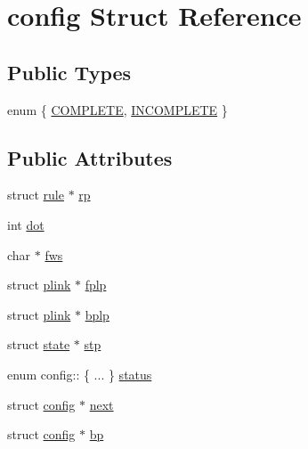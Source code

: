 \hypertarget{structconfig}{\section{config Struct Reference}
\label{structconfig}
}
\subsection*{Public Types}
\begin{DoxyCompactItemize}
\item 
enum \{ \hyperlink{structconfig_a3c18b366a1f919f2f9f27c814376259fa30b3ac7763c70e948cc9cdd60551ec07}{C\-O\-M\-P\-L\-E\-T\-E}, 
\hyperlink{structconfig_a3c18b366a1f919f2f9f27c814376259fa829cdb4c4ba84323cb0a2f4ca2217f7c}{I\-N\-C\-O\-M\-P\-L\-E\-T\-E}
 \}
\end{DoxyCompactItemize}
\subsection*{Public Attributes}
\begin{DoxyCompactItemize}
\item 
struct \hyperlink{structrule}{rule} $\ast$ \hyperlink{structconfig_a8e5c72aa9b4dbdfcda9cc9a33aa1ac59}{rp}
\item 
int \hyperlink{structconfig_aa628525de6016f3bd01f49499ef05cb3}{dot}
\item 
char $\ast$ \hyperlink{structconfig_ae14004c0e734d7865cf064a96361918f}{fws}
\item 
struct \hyperlink{structplink}{plink} $\ast$ \hyperlink{structconfig_ab9b1fbd290f96b7eeed8bd650258f128}{fplp}
\item 
struct \hyperlink{structplink}{plink} $\ast$ \hyperlink{structconfig_ad90a39b67a446352a0557937a4e65d1c}{bplp}
\item 
struct \hyperlink{structstate}{state} $\ast$ \hyperlink{structconfig_a1a4d98b23408bb047054579dd46c70e2}{stp}
\item 
enum config\-:: \{ ... \}  \hyperlink{structconfig_a51ab487668f5595d78e72ab9a78cbfb9}{status}
\item 
struct \hyperlink{structconfig}{config} $\ast$ \hyperlink{structconfig_a80193cbd04fe719812dc0afb71a33664}{next}
\item 
struct \hyperlink{structconfig}{config} $\ast$ \hyperlink{structconfig_a3b790fb1757e3950f7a4cfca10e2b8a7}{bp}
\end{DoxyCompactItemize}


